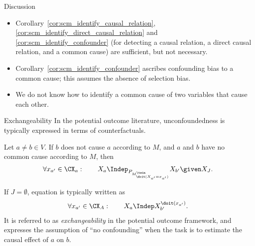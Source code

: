 \begin{frame}{Discussion}
  \begin{itemize}
    \item
      Corollary~\ref{cor:scm_identify_causal_relation}, \ref{cor:scm_identify_direct_causal_relation} and \ref{cor:scm_identify_confounder}
      (for detecting a causal relation, a direct causal relation, and a common cause)
      are sufficient, but not necessary.
    \item Corollary~\ref{cor:scm_identify_confounder} ascribes confounding bias to a common cause;
      this assumes the absence of selection bias.
    \item We do not know how to identify a common cause of two variables that cause each other.
  \end{itemize}
\end{frame}

\begin{frame}{Exchangeability}
In the potential outcome literature, unconfoundedness is typically expressed in terms of counterfactuals.
\begin{Prp}[\ref{prp:potential_outcome_unconfoundedness}]
Let $a \ne b \in V$.
If $b$ does not cause $a$ according to $M$, and $a$ and $b$ have no common cause according to $M$, then
  \begin{equation}\label{slides:eq:potential_outcome_unconfoundedness}
    \forall x_{a'} \in \CX_a: \qquad X_a \Indep_{P_{M^\twin_{\doit(X_{a'}=x_{a'})}}} X_{b'} \given X_J.
  \end{equation}
\end{Prp}
If $J = \emptyset$, equation  is typically written as
  $$\forall x_{a'} \in \CX_A : \qquad X_a \Indep X_{b'}^{\doit(x_{a'})}.$$
It is referred to as \emph{exchangeability} in the potential outcome framework, and 
expresses the assumption of ``no confounding'' when the task is to estimate the causal effect of $a$ on $b$. 
\end{frame}

